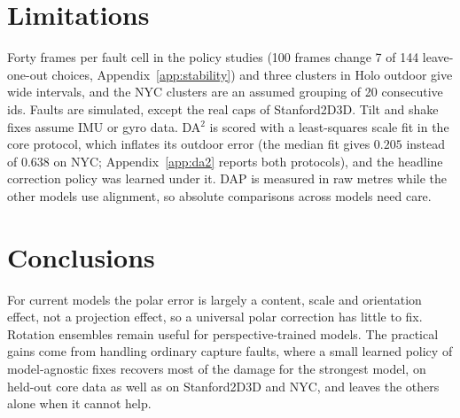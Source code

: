 \documentclass{article}
\begin{document}
\section{Limitations}
Forty frames per fault cell in the policy studies (100 frames change 7 of 144 leave-one-out choices, Appendix~\ref{app:stability}) and three clusters in Holo outdoor give wide intervals, and the NYC clusters are an assumed grouping of 20 consecutive ids. Faults are simulated, except the real caps of Stanford2D3D. Tilt and shake fixes assume IMU or gyro data. DA$^2$ is scored with a least-squares scale fit in the core protocol, which inflates its outdoor error (the median fit gives $0.205$ instead of $0.638$ on NYC; Appendix~\ref{app:da2} reports both protocols), and the headline correction policy was learned under it. DAP is measured in raw metres while the other models use alignment, so absolute comparisons across models need care.

\section{Conclusions}
For current models the polar error is largely a content, scale and orientation effect, not a projection effect, so a universal polar correction has little to fix. Rotation ensembles remain useful for perspective-trained models. The practical gains come from handling ordinary capture faults, where a small learned policy of model-agnostic fixes recovers most of the damage for the strongest model, on held-out core data as well as on Stanford2D3D and NYC, and leaves the others alone when it cannot help.
\end{document}
